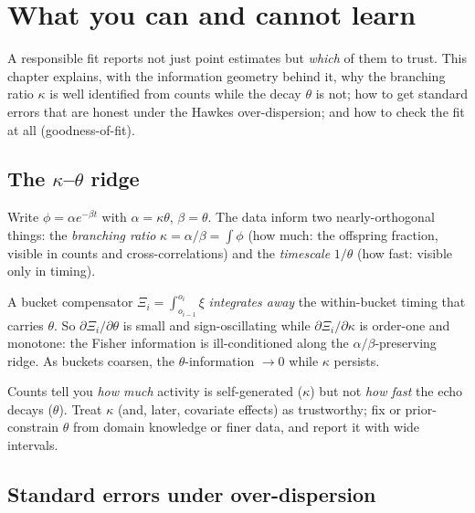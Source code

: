 \chapter{What you can and cannot learn}
\label{ch:identif}

\begin{motivation}
A responsible fit reports not just point estimates but \emph{which} of them to
trust. This chapter explains, with the information geometry behind it, why the
branching ratio $\kappa$ is well identified from counts while the decay $\theta$ is
not; how to get standard errors that are honest under the Hawkes over-dispersion;
and how to check the fit at all (goodness-of-fit).
\end{motivation}

\section{The $\kappa$--$\theta$ ridge}

Write $\phi=\alpha e^{-\beta t}$ with $\alpha=\kappa\theta$, $\beta=\theta$. The
data inform two nearly-orthogonal things: the \emph{branching ratio}
$\kappa=\alpha/\beta=\int\phi$ (how much: the offspring fraction, visible in counts
and cross-correlations) and the \emph{timescale} $1/\theta$ (how fast: visible only
in timing).

\begin{whybox}
A bucket compensator $\Xi_i=\int_{o_{i-1}}^{o_i}\xi$ \emph{integrates away} the
within-bucket timing that carries $\theta$. So $\partial\Xi_i/\partial\theta$ is
small and sign-oscillating while $\partial\Xi_i/\partial\kappa$ is order-one and
monotone: the Fisher information is ill-conditioned along the
$\alpha/\beta$-preserving ridge. As buckets coarsen, the $\theta$-information
$\to0$ while $\kappa$ persists.
\end{whybox}

\begin{intuitionbox}
Counts tell you \emph{how much} activity is self-generated ($\kappa$) but not
\emph{how fast} the echo decays ($\theta$). Treat $\kappa$ (and, later, covariate
effects) as trustworthy; fix or prior-constrain $\theta$ from domain knowledge or
finer data, and report it with wide intervals.
\end{intuitionbox}

\section{Standard errors under over-dispersion}

